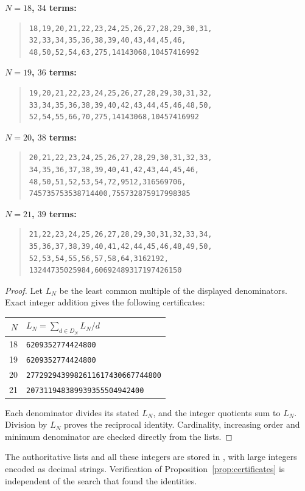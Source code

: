 \documentclass[10pt,a4paper]{article}
\newcommand{\code}[1]{\texttt{\detokenize{#1}}}
\begin{document}
\textbf{$N=18$, $34$ terms:}
\begin{quote}\small
\begin{verbatim}
18,19,20,21,22,23,24,25,26,27,28,29,30,31,
32,33,34,35,36,38,39,40,43,44,45,46,
48,50,52,54,63,275,14143068,10457416992
\end{verbatim}
\end{quote}
\textbf{$N=19$, $36$ terms:}
\begin{quote}\small
\begin{verbatim}
19,20,21,22,23,24,25,26,27,28,29,30,31,32,
33,34,35,36,38,39,40,42,43,44,45,46,48,50,
52,54,55,66,70,275,14143068,10457416992
\end{verbatim}
\end{quote}
\textbf{$N=20$, $38$ terms:}
\begin{quote}\small
\begin{verbatim}
20,21,22,23,24,25,26,27,28,29,30,31,32,33,
34,35,36,37,38,39,40,41,42,43,44,45,46,
48,50,51,52,53,54,72,9512,316569706,
745735753538714400,755732875917998385
\end{verbatim}
\end{quote}
\textbf{$N=21$, $39$ terms:}
\begin{quote}\small
\begin{verbatim}
21,22,23,24,25,26,27,28,29,30,31,32,33,34,
35,36,37,38,39,40,41,42,44,45,46,48,49,50,
52,53,54,55,56,57,58,64,3162192,
13244735025984,60692489317197426150
\end{verbatim}
\end{quote}
\begin{proof}
Let $L_N$ be the least common multiple of the displayed denominators. Exact
integer addition gives the following certificates:
\begin{center}
\begin{tabular}{rl}
\toprule
$N$ & $L_N=\sum_{d\in D_N}L_N/d$\\
\midrule
18 & \texttt{6209352774424800}\\
19 & \texttt{6209352774424800}\\
20 & \texttt{2772929439982611617430667744800}\\
21 & \texttt{207311948389939355504942400}\\
\bottomrule
\end{tabular}
\end{center}
Each denominator divides its stated $L_N$, and the integer quotients sum to
$L_N$. Division by $L_N$ proves the reciprocal identity. Cardinality, increasing
order and minimum denominator are checked directly from the lists.
\end{proof}
The authoritative lists and all these integers are stored in
\code{certificates-extension.json}, with large integers encoded as decimal
strings. Verification of Proposition~\ref{prop:certificates} is independent of
the search that found the identities.
\end{document}

